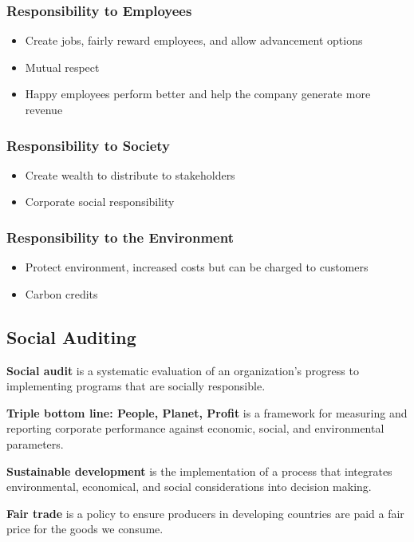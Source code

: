 \documentclass[english, 12pt]{article}
\begin{document}
\subsubsection*{Responsibility to Employees}
\begin{itemize}
\item Create jobs, fairly reward employees, and allow advancement options
\item Mutual respect
\item Happy employees perform better and help the company generate more revenue
\end{itemize}
\subsubsection*{Responsibility to Society}
\begin{itemize}
\item Create wealth to distribute to stakeholders
\item Corporate social responsibility
\end{itemize}
\subsubsection*{Responsibility to the Environment}
\begin{itemize}
\item Protect environment, increased costs but can be charged to customers
\item Carbon credits
\end{itemize}
\subsection{Social Auditing}
\begin{defn}
\textbf{Social audit} is a systematic evaluation of an organization's progress to implementing programs that are socially responsible.
\end{defn}
\begin{defn}
\textbf{Triple bottom line: People, Planet, Profit} is a framework for measuring and reporting corporate performance against economic, social, and environmental parameters.
\end{defn}
\begin{defn}
\textbf{Sustainable development} is the implementation of a process that integrates environmental, economical, and social considerations into decision making.
\end{defn}
\begin{defn}
\textbf{Fair trade} is a policy to ensure producers in developing countries are paid a fair price for the goods we consume.
\end{defn}
\end{document}
